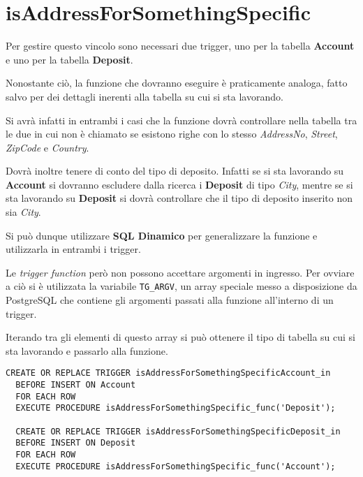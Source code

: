 \section{\textbf{isAddressForSomethingSpecific}}

Per gestire questo vincolo sono necessari due trigger, uno per la tabella \textbf{Account} e uno per la tabella \textbf{Deposit}.

Nonostante ciò, la funzione che dovranno eseguire è praticamente analoga, fatto salvo per dei dettagli inerenti alla tabella su cui si sta lavorando.

Si avrà infatti in entrambi i casi che la funzione dovrà controllare nella tabella tra le due in cui non è chiamato se esistono righe con lo stesso \textit{AddressNo}, \textit{Street}, \textit{ZipCode} e \textit{Country}.

Dovrà inoltre tenere di conto del tipo di deposito. Infatti se si sta lavorando su \textbf{Account} si dovranno escludere dalla ricerca i \textbf{Deposit} di tipo \textit{City}, mentre se si sta lavorando su \textbf{Deposit} si dovrà controllare che il tipo di deposito inserito non sia \textit{City}.

Si può dunque utilizzare \textbf{SQL Dinamico} per generalizzare la funzione e utilizzarla in entrambi i trigger.

Le \textit{trigger function} però non possono accettare argomenti in ingresso. Per ovviare a ciò si è utilizzata la variabile \lstinline{TG_ARGV}, un array speciale messo a disposizione da PostgreSQL che contiene gli argomenti passati alla funzione all'interno di un trigger.

Iterando tra gli elementi di questo array si può ottenere il tipo di tabella su cui si sta lavorando e passarlo alla funzione.

\begin{lstlisting}[caption={Creazione dei trigger per il vincolo \textbf{isAddressForSomethingSpecific}}]
  CREATE OR REPLACE TRIGGER isAddressForSomethingSpecificAccount_in
  BEFORE INSERT ON Account
  FOR EACH ROW
  EXECUTE PROCEDURE isAddressForSomethingSpecific_func('Deposit');

  CREATE OR REPLACE TRIGGER isAddressForSomethingSpecificDeposit_in
  BEFORE INSERT ON Deposit
  FOR EACH ROW
  EXECUTE PROCEDURE isAddressForSomethingSpecific_func('Account');
\end{lstlisting}

